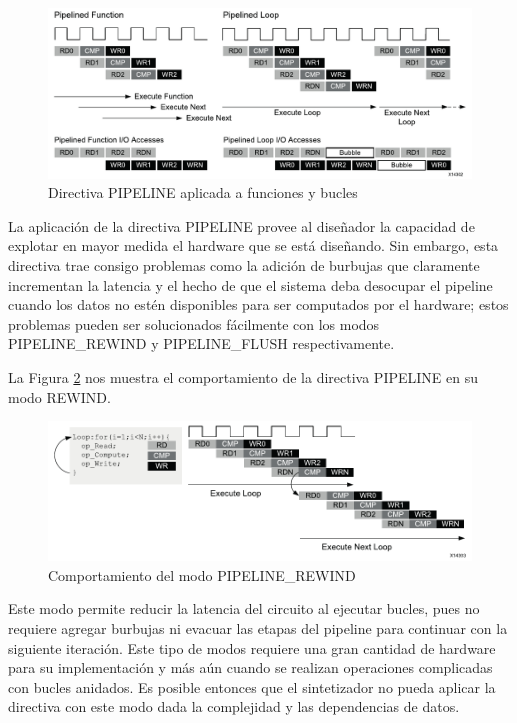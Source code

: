 \begin{figure}[H]
  \centering
    \includegraphics[scale=0.8]{./Figures/HLS18.pdf}
  \caption{Directiva PIPELINE aplicada a funciones y bucles \citep{HLS2015}}
  \label{fig:HLS18}
\end{figure}

La aplicación de la directiva PIPELINE provee al diseñador la capacidad de explotar en mayor medida el hardware que se está diseñando. Sin embargo, esta directiva trae consigo problemas como la adición de burbujas que claramente incrementan la latencia y el hecho de que el sistema deba desocupar el pipeline cuando los datos no estén disponibles para ser computados por el hardware; estos problemas pueden ser solucionados fácilmente con los modos PIPELINE\_REWIND y PIPELINE\_FLUSH respectivamente.

La Figura \ref{fig:HLS19} nos muestra el comportamiento de la directiva PIPELINE en su modo REWIND.

\begin{figure}[H]
  \centering
    \includegraphics[scale=0.8]{./Figures/HLS19.pdf}
  \caption{Comportamiento del modo PIPELINE\_REWIND  \citep{HLS2015}}
  \label{fig:HLS19}
\end{figure}

Este modo permite reducir la latencia del circuito al ejecutar bucles, pues no requiere agregar burbujas ni evacuar las etapas del pipeline para continuar con la siguiente iteración. Este tipo de modos requiere una gran cantidad de hardware para su implementación y más aún cuando se realizan operaciones complicadas con bucles anidados. Es posible entonces que el sintetizador no pueda aplicar la directiva con este modo dada la complejidad y las dependencias de datos.

